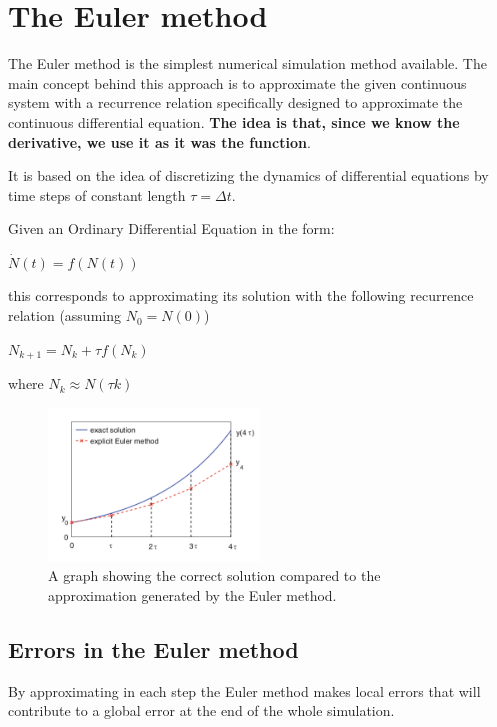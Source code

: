 \section{The Euler method}
The Euler method is the simplest numerical simulation method available. The main concept behind this approach is to approximate the given continuous system with a recurrence relation specifically designed to approximate the continuous differential equation. \textbf{The idea is that, since we know the derivative, we use it as it was the function}.\par
It is based on the idea of discretizing the dynamics of differential equations by time steps of constant length $\tau = \Delta t$.\par
Given an Ordinary Differential Equation in the form:

\begin{center}
$\dot{N}(t) = f(N(t))$ 
\end{center}
this corresponds to approximating its solution with the following recurrence relation (assuming $N_0 = N(0)$) 
\begin{center}
$N_{k+1} = N_k + \tau f(N_k)$ 
\end{center}
where $N_k \approx N(\tau k)$

\begin{figure}[h]
    \centering
    \includegraphics[width=0.5\textwidth]{Images/03 - Contiguous Dynamicsl System/Euler_method.png}
    \caption{A graph showing the correct solution compared to the approximation generated by the Euler method.} 
\end{figure}

\subsection{Errors in the Euler method}
By approximating in each step the Euler method makes local errors that will contribute to a global error at the end of the whole simulation.\par

